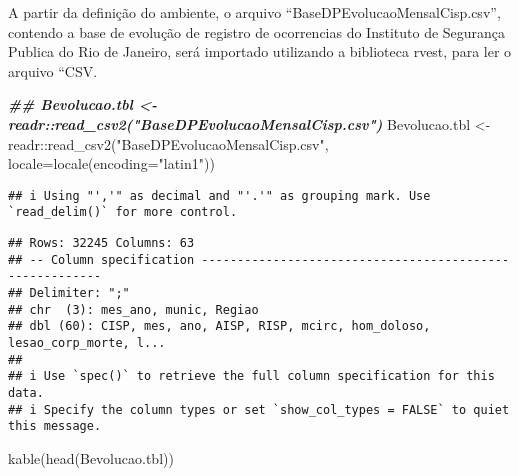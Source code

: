 \documentclass[
]{article}
\newenvironment{Shaded}{\begin{snugshade}}{\end{snugshade}}
\newcommand{\AttributeTok}[1]{\textcolor[rgb]{0.77,0.63,0.00}{#1}}
\newcommand{\DocumentationTok}[1]{\textcolor[rgb]{0.56,0.35,0.01}{\textbf{\textit{#1}}}}
\newcommand{\FunctionTok}[1]{\textcolor[rgb]{0.00,0.00,0.00}{#1}}
\newcommand{\NormalTok}[1]{#1}
\newcommand{\OtherTok}[1]{\textcolor[rgb]{0.56,0.35,0.01}{#1}}
\newcommand{\SpecialCharTok}[1]{\textcolor[rgb]{0.00,0.00,0.00}{#1}}
\newcommand{\StringTok}[1]{\textcolor[rgb]{0.31,0.60,0.02}{#1}}
\begin{document}
A partir da definição do ambiente, o arquivo ``BaseDPEvolucaoMensalCisp.csv'', contendo a base de evolução de registro de ocorrencias do Instituto de Segurança Publica do Rio de Janeiro, será importado utilizando a biblioteca rvest, para ler o arquivo ``CSV.

\begin{Shaded}
\begin{Highlighting}[]
\DocumentationTok{\#\# Bevolucao.tbl \textless{}{-} readr::read\_csv2("BaseDPEvolucaoMensalCisp.csv")}
\NormalTok{Bevolucao.tbl }\OtherTok{\textless{}{-}}\NormalTok{ readr}\SpecialCharTok{::}\FunctionTok{read\_csv2}\NormalTok{(}\StringTok{"BaseDPEvolucaoMensalCisp.csv"}\NormalTok{, }\AttributeTok{locale=}\FunctionTok{locale}\NormalTok{(}\AttributeTok{encoding=}\StringTok{"latin1"}\NormalTok{))}
\end{Highlighting}
\end{Shaded}

\begin{verbatim}
## i Using "','" as decimal and "'.'" as grouping mark. Use `read_delim()` for more control.
\end{verbatim}

\begin{verbatim}
## Rows: 32245 Columns: 63
## -- Column specification --------------------------------------------------------
## Delimiter: ";"
## chr  (3): mes_ano, munic, Regiao
## dbl (60): CISP, mes, ano, AISP, RISP, mcirc, hom_doloso, lesao_corp_morte, l...
## 
## i Use `spec()` to retrieve the full column specification for this data.
## i Specify the column types or set `show_col_types = FALSE` to quiet this message.
\end{verbatim}

\begin{Shaded}
\begin{Highlighting}[]
\FunctionTok{kable}\NormalTok{(}\FunctionTok{head}\NormalTok{(Bevolucao.tbl))}
\end{Highlighting}
\end{Shaded}
\end{document}
